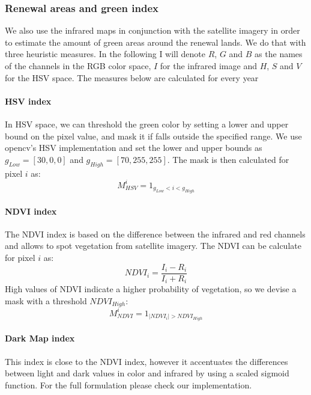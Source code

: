 \documentclass[12pt]{article}
\begin{document}
\subsubsection{Renewal areas and green index}
We also use the infrared maps in conjunction with the satellite imagery in order to estimate the amount of green areas around the renewal lands. We do that with three heuristic measures. In the following I will denote $R$, $G$ and $B$ as the names of the channels in the RGB color space, $I$ for the infrared image and $H$, $S$ and $V$ for the HSV space. The measures below are calculated for every year

\paragraph{HSV index}
In HSV space, we can threshold the green color by setting a lower and upper bound on the pixel value, and mask it if falls outside the specified range. We use opencv's HSV implementation and set the lower and upper bounds as $g_{Low} = [30, 0, 0]$ and $g_{High} = [70, 255, 255]$. The mask is then calculated for pixel $i$ as:
\begin{equation}
	M^i_{HSV} = 1_{g_{Low} < i < g_{High}}
\end{equation}

\paragraph{NDVI index}
The NDVI index is based on the difference between the infrared and red channels and allows to spot vegetation from satellite imagery. The NDVI can be calculate for pixel $i$ as:
\begin{equation}
	{NDVI}_i = \frac{I_i - R_i}{I_i + R_i}
\end{equation}
High values of NDVI indicate a higher probability of vegetation, so we devise a mask with a threshold $NDVI_{High}$:
\begin{equation}
	M^i_{NDVI} = 1_{|NDVI_i| > NDVI_{High}}
\end{equation}

\paragraph{Dark Map index}
This index is close to the NDVI index, however it accentuates the differences between light and dark values in color and infrared by using a scaled sigmoid function. For the full formulation please check our implementation.
\end{document}
